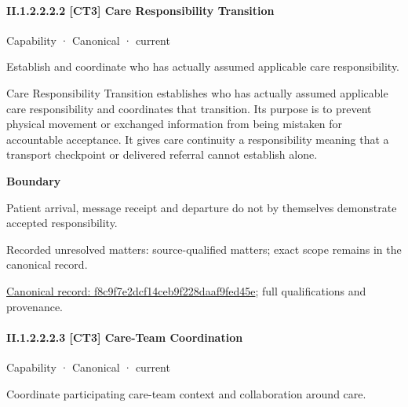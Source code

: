 \paragraph*{II.1.2.2.2.2 [CT3] Care Responsibility Transition}
\label{navigation:II.1.2.2.2.2}

\label{element:f8c9f7e2dcf14ceb9f228daaf9fed45e}
{\small Capability · Canonical · current}\par

Establish and coordinate who has actually assumed applicable care responsibility.



Care Responsibility Transition establishes who has actually assumed applicable care responsibility and coordinates that transition. Its purpose is to prevent physical movement or exchanged information from being mistaken for accountable acceptance. It gives care continuity a responsibility meaning that a transport checkpoint or delivered referral cannot establish alone.



\textbf{Boundary}



Patient arrival, message receipt and departure do not by themselves demonstrate accepted responsibility.


{\small Recorded unresolved matters: source-qualified matters; exact scope remains in the canonical record.}\par
{\footnotesize \href{../../../../continuum/strategy/capability/f8c9f7e2dcf14ceb9f228daaf9fed45e.md}{Canonical record: f8c9f7e2dcf14ceb9f228daaf9fed45e}; full qualifications and provenance.}\par
\paragraph*{II.1.2.2.2.3 [CT3] Care-Team Coordination}
\label{navigation:II.1.2.2.2.3}

\label{element:bbd138aab70d4b06b43662fb3f5373db}
{\small Capability · Canonical · current}\par

Coordinate participating care-team context and collaboration around care.



